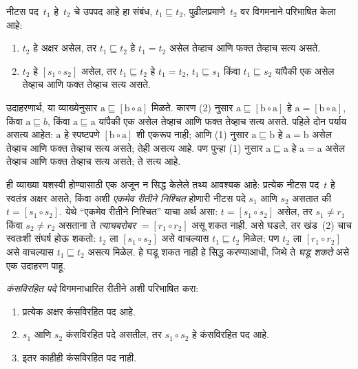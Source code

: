 \begin{defn}
नीटस पद~$t_1$ हे~$t_2$ चे उपपद आहे हा संबंध, $t_1 \sqsubseteq t_2$, पुढीलप्रमाणे~$t_2$ वर विगमनाने परिभाषित केला आहे:
\begin{enumerate}
\item $t_2$ हे अक्षर असेल, तर $t_1 \sqsubseteq t_2$ हे $t_1 = t_2$ असेल तेव्हाच आणि फक्त तेव्हाच सत्य असते.
\item $t_2$ हे $[s_1 \circ s_2]$ असेल, तर $t_1 \sqsubseteq t_2$ हे $t_1 = t_2$, $t_1 \sqsubseteq s_1$ किंवा $t_1 \sqsubseteq s_2$ यांपैकी एक असेल तेव्हाच आणि फक्त तेव्हाच सत्य असते.
\end{enumerate}
\end{defn}

उदाहरणार्थ, या व्याख्येनुसार $\mathrm{a} \sqsubseteq [\mathrm{b} \circ \mathrm{a}]$ मिळते. कारण (2) नुसार $\mathrm{a} \sqsubseteq [\mathrm{b} \circ \mathrm{a}]$ हे $\mathrm{a} = [\mathrm{b} \circ \mathrm{a}]$, किंवा $\mathrm{a} \sqsubseteq b$, किंवा $\mathrm{a} \sqsubseteq \mathrm{a}$ यांपैकी एक असेल तेव्हाच आणि फक्त तेव्हाच सत्य असते. पहिले दोन पर्याय असत्य आहेत: $\mathrm{a}$ हे स्पष्टपणे $[\mathrm{b} \circ \mathrm{a}]$ शी एकरूप नाही; आणि (1) नुसार $\mathrm{a} \sqsubseteq \mathrm{b}$ हे $\mathrm{a} = \mathrm{b}$ असेल तेव्हाच आणि फक्त तेव्हाच सत्य असते; तेही असत्य आहे. पण पुन्हा (1) नुसार $\mathrm{a} \sqsubseteq \mathrm{a}$ हे $\mathrm{a} = \mathrm{a}$ असेल तेव्हाच आणि फक्त तेव्हाच सत्य असते; ते सत्य आहे.

ही व्याख्या यशस्वी होण्यासाठी एक अजून न सिद्ध केलेले तथ्य आवश्यक आहे: प्रत्येक नीटस पद~$t$ हे स्वतंत्र अक्षर असते, किंवा अशी \emph{एकमेव रीतीने निश्चित} होणारी नीटस पदे $s_1$ आणि $s_2$ असतात की $t = [s_1 \circ s_2]$. येथे “एकमेव रीतीने निश्चित” याचा अर्थ असा: $t = [s_1 \circ s_2]$ असेल, तर $s_1 \neq r_1$ किंवा $s_2 \neq r_2$ असताना ते \emph{त्याचबरोबर} $= [r_1 \circ r_2]$ असू शकत नाही. असे घडले, तर खंड~(2) चाच स्वतःशी संघर्ष होऊ शकतो: $t_2$ ला $[s_1 \circ s_2]$ असे वाचल्यास $t_1 \sqsubseteq t_2$ मिळेल; पण $t_2$ ला $[r_1 \circ r_2]$ असे वाचल्यास $t_1 \sqsubseteq t_2$ असत्य मिळेल. हे घडू शकत नाही हे सिद्ध करण्याआधी, जिथे ते \emph{घडू शकते} असे एक उदाहरण पाहू.

\begin{defn}
\emph{कंसविरहित पदे} विगमनाधारित रीतीने अशी परिभाषित करा:
\begin{enumerate}
\item प्रत्येक अक्षर कंसविरहित पद आहे.
\item $s_1$ आणि $s_2$ कंसविरहित पदे असतील, तर $s_1 \circ s_2$ हे कंसविरहित पद आहे.
\item इतर काहीही कंसविरहित पद नाही.
\end{enumerate}
\end{defn}

